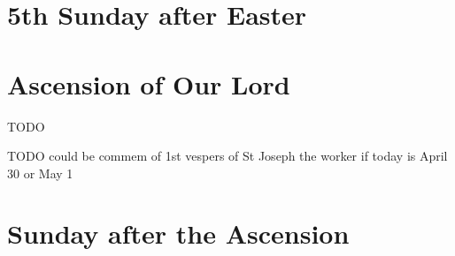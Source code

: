 {{
\section{5th Sunday after Easter}
\subtitle{2nd Class}
\benedicamusdomino{}
}

{
\section{Ascension of Our Lord}
\subtitle{1st Class}
TODO

TODO could be commem of 1st vespers of St Joseph the worker if today is April 30 or May 1

}

{
\section{Sunday after the Ascension}
\subtitle{2nd Class}
\def\printfullhymn{
    {
        \printhymn{\oldstylenums{\hymnlinetwo}}{\hymninitial}{\hymntex}{\hymntranslation}
        \def\vrlinebreak{T}
        \printvr[\greblockcustos]{\vrtex}{\vtranslation}{\rtranslation}
    }
}
\benedicamusdomino{}
}
}
